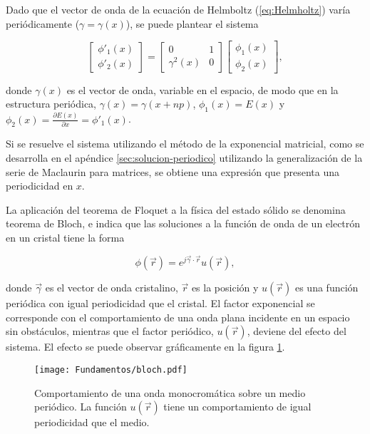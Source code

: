 Dado que el vector de onda de la ecuación de Helmboltz (\ref{eq:Helmholtz}) varía periódicamente ($\gamma = \gamma(x)$), se puede plantear el sistema

\begin{equation}
	\begin{bmatrix}
		\phi'_1(x) \\
		\phi'_2(x)
	\end{bmatrix}
	=
	\begin{bmatrix}
		0 & 1 \\
		\gamma^2(x) & 0
	\end{bmatrix}
	\begin{bmatrix}
		\phi_1(x) \\
		\phi_2(x)
	\end{bmatrix},
\end{equation}

donde $\gamma(x)$ es el vector de onda, variable en el espacio, de modo que en la estructura periódica, $\gamma(x) = \gamma(x+n p)$, $\phi_1(x) = E(x)$ y $\phi_2(x) = \frac{\partial E(x)}{\partial x} = \phi'_1(x)$. 

Si se resuelve el sistema utilizando el método de la exponencial matricial, como se desarrolla en el apéndice \ref{sec:solucion-periodico} utilizando la generalización de la serie de Maclaurin para matrices, se obtiene una expresión que presenta una periodicidad en $x$.



La aplicación del teorema de Floquet a la física del estado sólido se denomina teorema de Bloch, e indica que las soluciones a la función de onda de un electrón en un cristal tiene la forma

\begin{equation}
\label{eq:bloch-teorico}
\phi(\vec{r}) = e^{j\vec{\gamma} \cdot \vec{r}} u(\vec{r}),
\end{equation}

donde $\vec{\gamma}$ es el vector de onda cristalino, $\vec{r}$ es la posición y $u(\vec{r})$ es una función periódica con igual periodicidad que el cristal. El factor exponencial se corresponde con el comportamiento de una onda plana incidente en un espacio sin obstáculos, mientras que el factor periódico, $u(\vec{r})$, deviene del efecto del sistema. El efecto se puede observar gráficamente en la figura \ref{fig:bloch-periodico-1d}.

\begin{figure}[htp]
	\centering
	\texttt{[image: Fundamentos/bloch.pdf]}
	\caption{Comportamiento de una onda monocromática sobre un medio periódico. La función $u(\vec{r})$ tiene un comportamiento de igual periodicidad que el medio.}
	\label{fig:bloch-periodico-1d}
\end{figure}

